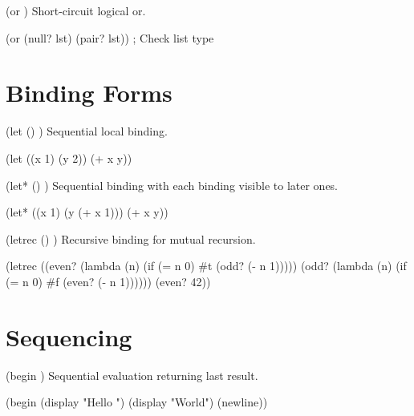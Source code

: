 \begin{syntaxspec}{(or )}
Short-circuit logical or.
\begin{lambdustcode}
(or (null? lst) (pair? lst))   ; Check list type
\end{lambdustcode}
\end{syntaxspec}

\section{Binding Forms}
\label{sec:binding}

\begin{syntaxspec}{(let () )}
Sequential local binding.
\begin{lambdustcode}
(let ((x 1) (y 2))
  (+ x y))
\end{lambdustcode}
\end{syntaxspec}

\begin{syntaxspec}{(let* () )}
Sequential binding with each binding visible to later ones.
\begin{lambdustcode}
(let* ((x 1) (y (+ x 1)))
  (+ x y))
\end{lambdustcode}
\end{syntaxspec}

\begin{syntaxspec}{(letrec () )}
Recursive binding for mutual recursion.
\begin{lambdustcode}
(letrec ((even? (lambda (n) 
                  (if (= n 0) #t (odd? (- n 1)))))
         (odd? (lambda (n)
                 (if (= n 0) #f (even? (- n 1))))))
  (even? 42))
\end{lambdustcode}
\end{syntaxspec}

\section{Sequencing}
\label{sec:sequencing}

\begin{syntaxspec}{(begin )}
Sequential evaluation returning last result.
\begin{lambdustcode}
(begin
  (display "Hello ")
  (display "World")
  (newline))
\end{lambdustcode}
\end{syntaxspec}

